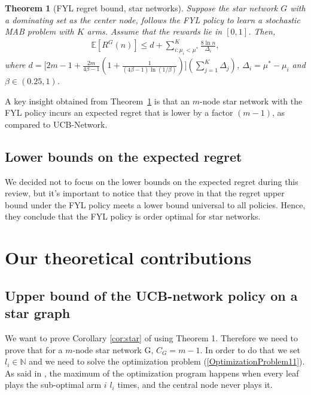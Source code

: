 \documentclass{article}
\newtheorem{theorem}{Theorem}
\begin{document}
\begin{theorem}[FYL regret bound, star networks]
\label{Thm:5.1}
Suppose the star network $G$ with a dominating set as the center node, follows the FYL policy to learn a stochastic MAB problem with $K$ arms. Assume that the rewards lie in $[0,1]$. Then,
\begin{align*}
\mathbb{E}[R^G(n)] \leq d + \sum\limits_{i:\mu_i < \mu^*}^K \frac{8 \ln n}{\Delta_i},
\end{align*}
where $d = \Big[ 2m - 1 + \frac{2 m}{4 \beta -1} \left( 1 + \frac{1}{(4 \beta -1) \ln (1/ \beta)} \right) \Big] \left( \sum\limits_{j=1}^K \Delta_j \right)$, $\Delta_i= \mu^* - \mu_i$ and $\beta \in (0.25,1)$.
\end{theorem}

A key insight obtained from Theorem~\ref{Thm:5.1} is that an $m$-node star network with the FYL policy incurs an expected regret that is lower by a factor $(m - 1)$, as compared to UCB-Network.

\subsection{Lower bounds on the expected regret}

We decided not to focus on the lower bounds on the expected regret during this review, but it's important to notice that they prove in \cite{DBLP:journals/corr/KollaJG16} that the regret upper bound under the FYL policy meets a lower bound universal to all policies. Hence, they conclude that the FYL policy is order optimal for star networks.


\section{Our theoretical contributions}

\subsection{Upper bound of the UCB-network policy on a star graph}

We want to prove Corollary \ref{cor:star} of \cite{DBLP:journals/corr/KollaJG16} using Theorem 1. Therefore we need to prove that for a $m$-node star network G, $C_G = m-1$. In order to do that we set $l_i \in \mathbb{N}$ and we need to solve the optimization problem (\ref{OptimizationProblem11}). As said in \cite{DBLP:journals/corr/KollaJG16}, the maximum of the optimization program happens when every leaf plays the sub-optimal arm $i$ $l_i$ times, and the central node never plays it. \\
\end{document}
